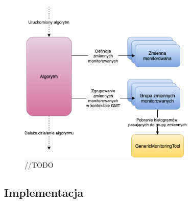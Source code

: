 \begin{figure}[!ht]
\centering
\includegraphics[width=0.75\textwidth]{img/algo_run.png}
\caption{
//TODO
}
\label{fig:athena:oldFlow}
\end{figure}

\subsection{Implementacja}

